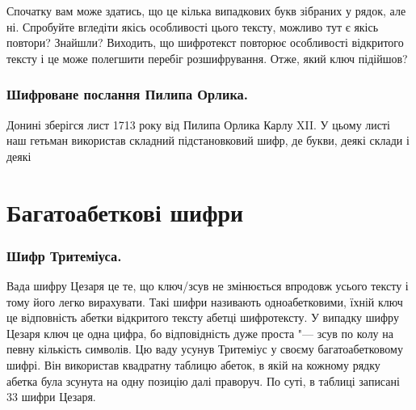 \documentclass{book}
\begin{document}
Спочатку вам може здатись, що це кілька випадкових букв зібраних у рядок, але ні.
Спробуйте вгледіти якісь особливості цього тексту, можливо тут є якісь повтори?
Знайшли? Виходить, що шифротекст повторює особливості відкритого тексту і це може
полегшити перебіг розшифрування. Отже, який ключ підійшов?

\subsection*{Шифроване послання Пилипа Орлика.}
Донині зберігся лист 1713 року від Пилипа Орлика Карлу XII. У цьому листі наш
гетьман використав складний підстановковий шифр, де букви, деякі склади і деякі


\chapter*{Багатоабеткові шифри}

\subsection*{Шифр Тритеміуса.}

Вада шифру Цезаря це те, що ключ/зсув не змінюється впродовж усього тексту і
тому його легко вирахувати. Такі шифри називають одноабетковими, їхній ключ це
відповність абетки відкритого тексту абетці шифротексту. У випадку шифру Цезаря
ключ це одна цифра, бо відповідність дуже проста "--- зсув по колу на певну
кількість символів. Цю ваду усунув Тритеміус у своєму багатоабетковому шифрі.
Він використав квадратну таблицю абеток, в якій на кожному рядку абетка була
зсунута на одну позицію далі праворуч. По суті, в таблиці записані 33 шифри
Цезаря.
\end{document}
